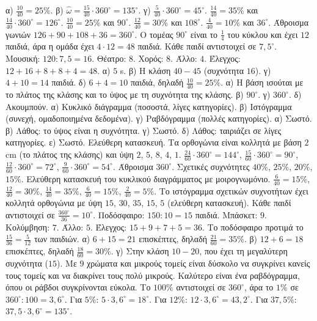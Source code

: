  α) $\frac{10}{40}=25\%$. β) $\hat{\omega}=\frac{15}{40}\cdot360^\circ=135^\circ$. γ) $\frac{5}{40}\cdot360^\circ=45^\circ$.
 $\frac{14}{40}=35\%$ και $\frac{14}{40}\cdot360^\circ=126^\circ$. $\frac{10}{40}=25\%$ και $90^\circ$. $\frac{12}{40}=30\%$ και $108^\circ$. $\frac{4}{40}=10\%$ και $36^\circ$. Άθροισμα γωνιών $126+90+108+36=360^\circ$.
 Ο τομέας $90^\circ$ είναι το $\frac{1}{4}$ του κύκλου και έχει $12$ παιδιά, άρα η ομάδα έχει $4\cdot12=48$ παιδιά. Κάθε παιδί αντιστοιχεί σε $7{,}5^\circ$. Μουσική: $120:7{,}5=16$. Θέατρο: $8$. Χορός: $8$. Άλλο: $4$. Έλεγχος: $12+16+8+8+4=48$.
 α) $5$ s. β) Η κλάση $40-45$ (συχνότητα $16$). γ) $4+10=14$ παιδιά. δ) $6+4=10$ παιδιά, δηλαδή $\frac{10}{40}=25\%$.
 α) Η βάση ισούται με το πλάτος της κλάσης και το ύψος με τη συχνότητα της κλάσης. β) $90^\circ$. γ) $360^\circ$. δ) Ακουμπούν.
 α) Κυκλικό διάγραμμα (ποσοστά, λίγες κατηγορίες). β) Ιστόγραμμα (συνεχή, ομαδοποιημένα δεδομένα). γ) Ραβδόγραμμα (πολλές κατηγορίες).
 α) Σωστό. β) Λάθος: το ύψος είναι η συχνότητα. γ) Σωστό. δ) Λάθος: ταιριάζει σε λίγες κατηγορίες. ε) Σωστό.
 Ελεύθερη κατασκευή. Τα ορθογώνια είναι κολλητά με βάση $2$ cm (το πλάτος της κλάσης) και ύψη $2$, $5$, $8$, $4$, $1$.
 $\frac{24}{60}\cdot360^\circ=144^\circ$, $\frac{15}{60}\cdot360^\circ=90^\circ$, $\frac{12}{60}\cdot360^\circ=72^\circ$, $\frac{9}{60}\cdot360^\circ=54^\circ$. Άθροισμα $360^\circ$. Σχετικές συχνότητες $40\%$, $25\%$, $20\%$, $15\%$. Ελεύθερη κατασκευή του κυκλικού διαγράμματος με μοιρογνωμόνιο.
 $\frac{6}{40}=15\%$, $\frac{12}{40}=30\%$, $\frac{14}{40}=35\%$, $\frac{6}{40}=15\%$, $\frac{2}{40}=5\%$. Το ιστόγραμμα σχετικών συχνοτήτων έχει κολλητά ορθογώνια με ύψη $15$, $30$, $35$, $15$, $5$ (ελεύθερη κατασκευή).
 Κάθε παιδί αντιστοιχεί σε $\frac{360^\circ}{36}=10^\circ$. Ποδόσφαιρο: $150:10=15$ παιδιά. Μπάσκετ: $9$. Κολύμβηση: $7$. Άλλο: $5$. Έλεγχος: $15+9+7+5=36$. Το ποδόσφαιρο προτιμά το $\frac{15}{36}=\frac{5}{12}$ των παιδιών.
 α) $6+15=21$ επισκέπτες, δηλαδή $\frac{21}{60}=35\%$. β) $12+6=18$ επισκέπτες, δηλαδή $\frac{18}{60}=30\%$. γ) Στην κλάση $10-20$, που έχει τη μεγαλύτερη συχνότητα ($15$).
 Με $9$ χρώματα και μικρούς τομείς είναι δύσκολο να συγκρίνει κανείς τους τομείς και να διακρίνει τους πολύ μικρούς. Καλύτερο είναι ένα ραβδόγραμμα, όπου οι ράβδοι συγκρίνονται εύκολα.
 Το $100\%$ αντιστοιχεί σε $360^\circ$, άρα το $1\%$ σε $360^\circ:100=3{,}6^\circ$. Για $5\%$: $5\cdot3{,}6^\circ=18^\circ$. Για $12\%$: $12\cdot3{,}6^\circ=43{,}2^\circ$. Για $37{,}5\%$: $37{,}5\cdot3{,}6^\circ=135^\circ$.
